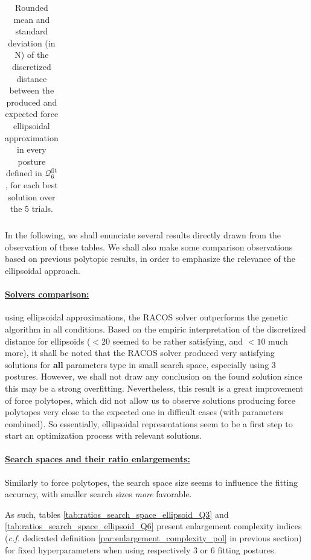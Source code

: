 \begin{table}[!ht]
\begin{tabular}{|c|c|c|c|c|c|c|c|c|c|}
    \end{tabular}
    \caption{Rounded mean and standard deviation (in N) of the discretized distance between the produced and expected force ellipsoidal approximation in every posture defined in $\mathcal{Q}_6^{\text{fit}}$, for each best solution over the 5 trials.}
    \label{tab:accuracy_fitting_ellipsoid_p6}
\end{table}
\egroup

\clearpage
In the following, we shall enunciate several results directly drawn from the observation of these tables. We shall also make some comparison observations based on previous polytopic results, in order to emphasize the relevance of the ellipsoidal approach.

\paragraph*{\underline{Solvers comparison:}} using ellipsoidal approximations, the RACOS solver outperforms the genetic algorithm in all conditions. Based on the empiric interpretation of the discretized distance for ellipsoids ($< 20$ seemed to be rather satisfying, and $<10$ much more), it shall be noted that the RACOS solver produced very satisfying solutions for \textbf{all} parameters type in small search space, especially using 3 postures. However, we shall not draw any conclusion on the found solution since this may be a strong overfitting. Nevertheless, this result is a great improvement of force polytopes, which did not allow us to observe solutions producing force polytopes very close to the expected one in difficult cases (with parameters combined). So essentially, ellipsoidal representations seem to be a first step to start an optimization process with relevant solutions.

\paragraph*{\underline{Search spaces and their ratio enlargements:}}
Similarly to force polytopes, the search space size seems to influence the fitting accuracy, with smaller search sizes \emph{more} favorable. 

As such, tables \ref{tab:ratios_search_space_ellipsoid_Q3} and \ref{tab:ratios_search_space_ellipsoid_Q6} present enlargement complexity indices (\emph{c.f.} dedicated definition \ref{par:enlargement_complexity_pol} in previous section) for fixed hyperparameters when using respectively 3 or 6 fitting postures.

